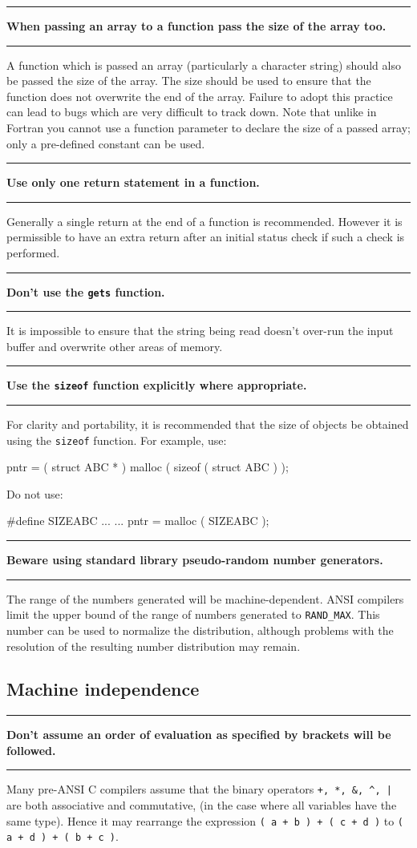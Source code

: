 \documentclass[twoside,11pt,nolof,noabs]{starlink}
\newcounter{sruleno}
\newcommand{\srule}[1]{
    \addtocounter{sruleno}{1}
    \goodbreak
    \rule{\textwidth}{0.3mm}
    \textbf{#1} \scpushright{\textbf{\thesruleno}}
    \rule{\textwidth}{0.1mm}
}
\begin{document}
\srule{When passing an array to a function pass the size of the array
too.}
A function which is passed an array (particularly a
character string) should also be passed the size of the array.
The size should be used to ensure that the function does not overwrite the
end of the array.
Failure to adopt this practice can lead to bugs which are very difficult to
track down.  Note that unlike in Fortran you cannot use a function parameter
to declare the size of a passed array; only a pre-defined constant can be used.


\srule{Use only one return statement in a function.}
Generally a single return at the end of a function is recommended.
However it is permissible to have an extra return after
an initial status check if such a check is performed.


\srule{Don't use the \texttt{gets} function.}
It is impossible to ensure that the string being
read doesn't over-run the input buffer and overwrite other areas of memory.

\srule{Use the \texttt{sizeof} function explicitly where appropriate.}
For clarity and portability, it is recommended that the size of objects be
obtained using the \verb~sizeof~ function.
For example, use:
\begin{terminalv}
      pntr = ( struct ABC * ) malloc ( sizeof ( struct ABC ) );
\end{terminalv}

Do not use:
\begin{terminalv}
      #define SIZEABC ...
         ...
      pntr = malloc ( SIZEABC );
\end{terminalv}


\srule{Beware using standard library pseudo-random number generators.}
The range of the numbers generated will be machine-dependent.
ANSI compilers limit the upper bound of the range of numbers generated to
\texttt{RAND\_MAX}.
This number can be used to normalize the distribution, although
problems with the resolution of the resulting number distribution may remain.


\subsection{Machine independence}


\srule{Don't assume an order of evaluation as specified by brackets
will be followed.}
Many pre-ANSI C compilers assume that the binary operators
\verb~+, *, &, ^, |~
are both associative and commutative, (in the case where all variables have
the same type).
Hence it may rearrange the expression
\texttt{( a + b ) + ( c + d )} to \texttt{( a + d ) + ( b + c )}.
\end{document}
